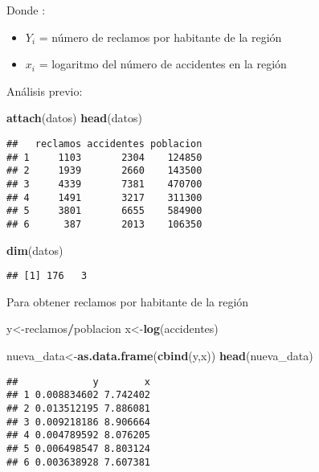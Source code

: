 \documentclass[]{article}
\newenvironment{Shaded}{\begin{snugshade}}{\end{snugshade}}
\newcommand{\KeywordTok}[1]{\textcolor[rgb]{0.13,0.29,0.53}{\textbf{#1}}}
\newcommand{\NormalTok}[1]{#1}
\newcommand{\OperatorTok}[1]{\textcolor[rgb]{0.81,0.36,0.00}{\textbf{#1}}}
\providecommand{\tightlist}{%
  \setlength{\itemsep}{0pt}\setlength{\parskip}{0pt}}
\begin{document}
Donde :

\begin{itemize}
\tightlist
\item
  \(Y_i\) = número de reclamos por habitante de la región
\item
  \(x_i\) = logaritmo del número de accidentes en la región
\end{itemize}

Análisis previo:

\begin{Shaded}
\begin{Highlighting}[]
\KeywordTok{attach}\NormalTok{(datos)}
\KeywordTok{head}\NormalTok{(datos)}
\end{Highlighting}
\end{Shaded}

\begin{verbatim}
##   reclamos accidentes poblacion
## 1     1103       2304    124850
## 2     1939       2660    143500
## 3     4339       7381    470700
## 4     1491       3217    311300
## 5     3801       6655    584900
## 6      387       2013    106350
\end{verbatim}

\begin{Shaded}
\begin{Highlighting}[]
\KeywordTok{dim}\NormalTok{(datos)}
\end{Highlighting}
\end{Shaded}

\begin{verbatim}
## [1] 176   3
\end{verbatim}

Para obtener reclamos por habitante de la región

\begin{Shaded}
\begin{Highlighting}[]
\NormalTok{y<{-}reclamos}\OperatorTok{/}\NormalTok{poblacion}
\NormalTok{x<{-}}\KeywordTok{log}\NormalTok{(accidentes)}
\end{Highlighting}
\end{Shaded}

\begin{Shaded}
\begin{Highlighting}[]
\NormalTok{nueva\_data<{-}}\KeywordTok{as.data.frame}\NormalTok{(}\KeywordTok{cbind}\NormalTok{(y,x))}
\KeywordTok{head}\NormalTok{(nueva\_data)}
\end{Highlighting}
\end{Shaded}

\begin{verbatim}
##             y        x
## 1 0.008834602 7.742402
## 2 0.013512195 7.886081
## 3 0.009218186 8.906664
## 4 0.004789592 8.076205
## 5 0.006498547 8.803124
## 6 0.003638928 7.607381
\end{verbatim}
\end{document}
